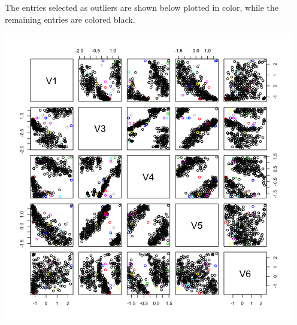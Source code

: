 \documentclass[11pt]{article}
\begin{document}
\begin{enumerate}
\begin{itemize}
\begin{figure}[H]
\begin{center}
{\begin{centering}
\par\end{centering}}
\quad{}
\end{center}
\end{figure}


The entries selected as outliers are shown below plotted in color, while the remaining entries are colored black. 

\begin{center}
\includegraphics[scale=0.35]{all_plot}
\end{center}


\end{itemize}
\end{enumerate}
\end{document}
